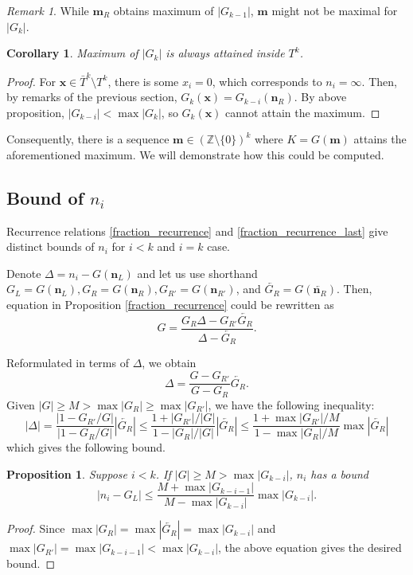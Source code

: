 \documentclass{article}
\theoremstyle{definition}
\theoremstyle{plain}
\newtheorem{corollary}[theorem]{Corollary}
\newtheorem{proposition}{Proposition}[section]
\theoremstyle{remark}
\newtheorem*{remark}{Remark}
\numberwithin{equation}{section}
\newcommand{\integer}{\mathbb{Z}}
\newcommand{\abs}[1]{\left\lvert{#1}\right\rvert}
\begin{document}
\begin{remark}
  While $\mathbf{m}_R$ obtains maximum of $\abs{G_{k-1}}$, $\mathbf{m}$ might not be maximal for $\abs{G_k}$.
\end{remark}

\begin{corollary}
  Maximum of $\abs{G_k}$ is always attained inside $T^k$.
\end{corollary}
\begin{proof}
  For $\mathbf{x} \in \bar{T}^k \setminus T^k$, there is some $x_i = 0$, which corresponds to $n_i = \infty$.
  Then, by remarks of the previous section, $G_k(\mathbf{x}) = G_{k-i}(\mathbf{n}_R)$.
  By above proposition, $\abs{G_{k-i}} < \max \abs{G_k}$, so $G_k(\mathbf{x})$ cannot attain the maximum.
\end{proof}

Consequently, there is a sequence $\mathbf{m} \in (\integer \setminus \{ 0 \})^k$
where $K = G(\mathbf{m})$ attains the aforementioned maximum.
We will demonstrate how this could be computed.

\subsection{Bound of $n_i$}

Recurrence relations \ref{fraction_recurrence} and \ref{fraction_recurrence_last}
give distinct bounds of $n_i$ for $i < k$ and $i = k$ case.

Denote $\Delta = n_i - G(\mathbf{n}_L)$ and let us use shorthand
$G_L = G(\mathbf{n}_L), G_R = G(\mathbf{n}_R),
  G_{R'} = G(\mathbf{n}_{R'})$, and $\overleftarrow{G_R} = G(\overleftarrow{\mathbf{n}_R})$.
Then, equation in Proposition \ref{fraction_recurrence} could be rewritten as
\[
  G = \frac{G_R \Delta - G_{R'} \overleftarrow{G_R}}{\Delta - \overleftarrow{G_R}}.
\]

Reformulated in terms of $\Delta$, we obtain
\[
  \Delta = \frac{G - G_{R'}}{G - G_R} \overleftarrow{G_R}.
\]
Given $|G| \geq M > \max \abs{G_R} \geq \max \abs{G_{R'}}$, we have the following inequality:
\[
  |\Delta| = \frac{\abs{1 - G_{R'} / G}}{\abs{1 - G_R / G}} \abs{\overleftarrow{G_R}}
  \leq \frac{1 + \abs{G_{R'}} / \abs{G}}{1 - \abs{G_R} / \abs{G}} \abs{\overleftarrow{G_R}}
  \leq \frac{1 + \max \abs{G_{R'}} / M}{1 - \max \abs{G_R} / M} \max \abs{\overleftarrow{G_R}}
\]
which gives the following bound.

\begin{proposition}\label{fraction_bound}
  Suppose $i < k$. If $|G| \geq M > \max \abs{G_{k-i}}$, $n_i$ has a bound
  \[
    \abs{n_i - G_L} \leq \frac{M + \max \abs{G_{k-i-1}}}{M - \max \abs{G_{k-i}}} \max \abs{G_{k-i}}.
  \]
\end{proposition}
\begin{proof}
  Since $\max \abs{G_R} = \max \abs{\overleftarrow{G_R}} = \max \abs{G_{k - i}}$
  and $\max \abs{G_{R'}} = \max \abs{G_{k-i-1}} < \max \abs{G_{k - i}}$,
  the above equation gives the desired bound.
\end{proof}
\end{document}
